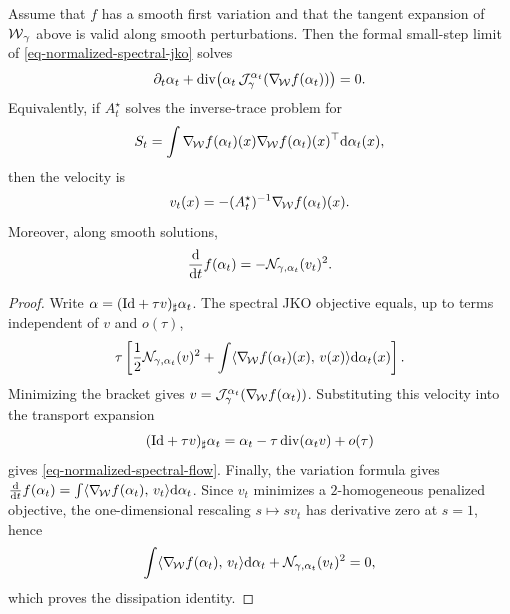 \begin{prop}\label{prop-normalized-spectral-gradient-flow}
	Assume that $f$ has a smooth first variation and that the tangent expansion of $\operatorname{\mathcal{W}}_\gamma$ above is valid along smooth perturbations. Then the formal small-step limit of \eqref{eq-normalized-spectral-jko} solves
	\begin{equation}\label{eq-normalized-spectral-flow}
		\partial_t\alpha_t
		+
		\operatorname{div}\!\left(
		\alpha_t\,\mathcal J_{\gamma}^{\alpha_t}(\nabla_{\!\operatorname{\mathcal{W}}} f(\alpha_t))
		\right)=0.
	\end{equation}
	Equivalently, if $A_t^\star$ solves the inverse-trace problem for
	\[
		S_t=\int \nabla_{\!\operatorname{\mathcal{W}}} f(\alpha_t)(x)\nabla_{\!\operatorname{\mathcal{W}}} f(\alpha_t)(x)^\top\mathrm{d}\alpha_t(x),
	\]
	then the velocity is
	\[
		v_t(x)=-(A_t^\star)^{-1}\nabla_{\!\operatorname{\mathcal{W}}} f(\alpha_t)(x).
	\]
	Moreover, along smooth solutions,
	\[
		\frac{\mathrm{d}}{\mathrm{d} t}f(\alpha_t)
		=
		-\mathcal N_{\gamma,\alpha_t}(v_t)^2.
	\]
\end{prop}
\begin{proof}
	Write $\alpha=(\mathrm{Id}+\tau v)_\sharp\alpha_t$. The spectral JKO objective equals, up to terms independent of $v$ and $o(\tau)$,
	\[
		\tau\left[
		\frac12\mathcal N_{\gamma,\alpha_t}(v)^2
		+
		\int\langle \nabla_{\!\operatorname{\mathcal{W}}} f(\alpha_t)(x),\,v(x)\rangle\mathrm{d}\alpha_t(x)
		\right].
	\]
	Minimizing the bracket gives $v=\mathcal J_{\gamma}^{\alpha_t}(\nabla_{\!\operatorname{\mathcal{W}}} f(\alpha_t))$. Substituting this velocity into the transport expansion
	\[
		(\mathrm{Id}+\tau v)_\sharp\alpha_t
		=
		\alpha_t-\tau\operatorname{div}(\alpha_t v)+o(\tau)
	\]
	gives \eqref{eq-normalized-spectral-flow}.
	Finally, the variation formula gives $\frac{\mathrm{d}}{\mathrm{d} t}f(\alpha_t)=\int\langle \nabla_{\!\operatorname{\mathcal{W}}} f(\alpha_t),\,v_t\rangle\mathrm{d}\alpha_t$. Since $v_t$ minimizes a $2$-homogeneous penalized objective, the one-dimensional rescaling $s\mapsto sv_t$ has derivative zero at $s=1$, hence
	\[
		\int\langle \nabla_{\!\operatorname{\mathcal{W}}} f(\alpha_t),\,v_t\rangle\mathrm{d}\alpha_t
		+
		\mathcal N_{\gamma,\alpha_t}(v_t)^2
		=0,
	\]
	which proves the dissipation identity.
\end{proof}

